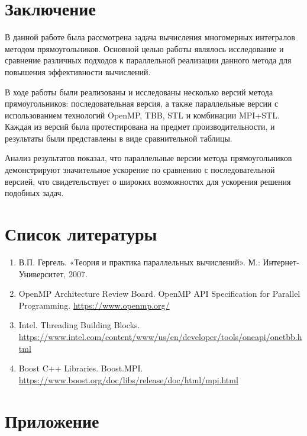 \documentclass[12pt,a4paper]{extarticle}
\begin{document}
\newpage
\section{Заключение}
В данной работе была рассмотрена задача вычисления многомерных интегралов методом прямоугольников. Основной целью работы являлось исследование и сравнение различных подходов к параллельной реализации данного метода для повышения эффективности вычислений.

В ходе работы были реализованы и исследованы несколько версий метода прямоугольников: последовательная версия, а также параллельные версии с использованием технологий OpenMP, TBB, STL и комбинации MPI+STL. Каждая из версий была протестирована на предмет производительности, и результаты были представлены в виде сравнительной таблицы.

Анализ результатов показал, что параллельные версии метода прямоугольников демонстрируют значительное ускорение по сравнению с последовательной версией, что свидетельствует о широких возможностях для ускорения решения подобных задач.

\newpage
\section{Список литературы}
\begin{enumerate}
  \item В.П. Гергель. «Теория и практика параллельных вычислений». М.: Интернет-Университет, 2007.
  \item OpenMP Architecture Review Board. OpenMP API Specification for Parallel Programming. \url{https://www.openmp.org/}
  \item Intel. Threading Building Blocks. \url{https://www.intel.com/content/www/us/en/developer/tools/oneapi/onetbb.html}
  \item Boost C++ Libraries. Boost.MPI. \url{https://www.boost.org/doc/libs/release/doc/html/mpi.html}
\end{enumerate}

\newpage
\appendix
\section{Приложение}
\end{document}
